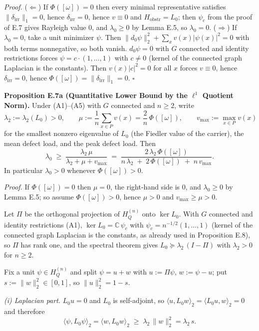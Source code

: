 \documentclass[
]{article}
\begin{document}
\emph{Proof.} (\(\Leftarrow\)) If \(\Phi([\omega]) = 0\) then every minimal representative satisfies \(\|\delta_{\mathrm{irr}}\|_1 = 0\), hence \(\delta_{\mathrm{irr}} = 0\), hence \(v \equiv 0\) and \(H_{\mathrm{obstr}} = L_0\); then \(\psi_c\) from the proof of E.7 gives Rayleigh value \(0\), and \(\lambda_0 \ge 0\) by Lemma E.5, so \(\lambda_0 = 0\).
(\(\Rightarrow\)) If \(\lambda_0 = 0\), take a unit minimizer \(\psi\). Then \(\|d_0\psi\|_2^2 + \sum_x v(x)|\psi(x)|^2 = 0\) with both terms nonnegative, so both vanish. \(d_0 \psi = 0\) with \(G\) connected and identity restrictions forces \(\psi = c \cdot (1,\dots,1)\) with \(c \neq 0\) (kernel of the connected graph Laplacian is the constants). Then \(v(x)|c|^2 = 0\) for all \(x\) forces \(v \equiv 0\), hence \(\delta_{\mathrm{irr}} = 0\), hence \(\Phi([\omega]) = \|\delta_{\mathrm{irr}}\|_1 = 0\). \(\square\)

\textbf{Proposition E.7a (Quantitative Lower Bound by the \(\ell^1\) Quotient Norm).} Under (A1)--(A5) with \(G\) connected and \(n \ge 2\), write
\[\lambda_2 := \lambda_2(L_0) > 0, \qquad \mu := \frac{1}{n}\sum_{x \in P} v(x) = \frac{2}{n}\,\Phi([\omega]), \qquad v_{\max} := \max_{x \in P} v(x)\]
for the smallest nonzero eigenvalue of \(L_0\) (the Fiedler value of the carrier), the mean defect load, and the peak defect load. Then
\[\lambda_0 \;\ge\; \frac{\lambda_2\,\mu}{\lambda_2 + \mu + v_{\max}} \;=\; \frac{2\,\lambda_2\,\Phi([\omega])}{n\,\lambda_2 \;+\; 2\,\Phi([\omega]) \;+\; n\,v_{\max}} .\]
In particular \(\lambda_0 > 0\) whenever \(\Phi([\omega]) > 0\).

\emph{Proof.} If \(\Phi([\omega]) = 0\) then \(\mu = 0\), the right-hand side is \(0\), and \(\lambda_0 \ge 0\) by Lemma E.5; so assume \(\Phi([\omega]) > 0\), hence \(\mu > 0\) and \(v_{\max} \ge \mu > 0\).

Let \(\Pi\) be the orthogonal projection of \(H_Q^{(n)}\) onto \(\ker L_0\). With \(G\) connected and identity restrictions (A1), \(\ker L_0 = \mathbb{C}\,\psi_c\) with \(\psi_c = n^{-1/2}(1,\dots,1)\) (kernel of the connected graph Laplacian is the constants, as already used in Proposition E.8), so \(\Pi\) has rank one, and the spectral theorem gives \(L_0 \succeq \lambda_2\,(I - \Pi)\) with \(\lambda_2 > 0\) for \(n \ge 2\).

Fix a unit \(\psi \in H_Q^{(n)}\) and split \(\psi = u + w\) with \(u := \Pi\psi\), \(w := \psi - u\); put \(s := \|w\|_2^2 \in [0,1]\), so \(\|u\|_2^2 = 1 - s\).

\emph{(i) Laplacian part.} \(L_0 u = 0\) and \(L_0\) is self-adjoint, so \(\langle u, L_0 w\rangle_2 = \langle L_0 u, w\rangle_2 = 0\) and therefore
\[\langle \psi, L_0 \psi\rangle_2 = \langle w, L_0 w\rangle_2 \;\ge\; \lambda_2\,\|w\|_2^2 = \lambda_2\, s .\]
\end{document}
